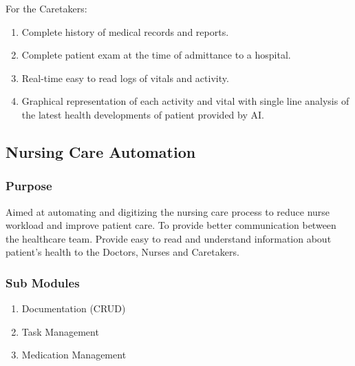 For the Caretakers:
\begin{enumerate}
    \item Complete history of medical records and reports.
    \item Complete patient exam at the time of admittance to a hospital.
    \item Real-time easy to read logs of vitals and activity.
    \item Graphical representation of each activity and vital with single line analysis of the latest health developments of patient provided by AI.
\end{enumerate}

\subsection{Nursing Care Automation}
\subsubsection{Purpose}
Aimed at automating and digitizing the nursing care process to reduce nurse workload and improve patient care. To provide better communication between the healthcare team. Provide easy to read and understand information about patient's health to the Doctors, Nurses and Caretakers.
\subsubsection{Sub Modules}
\begin{enumerate}
    \item Documentation (CRUD)
    \item Task Management
    \item Medication Management
\end{enumerate}
